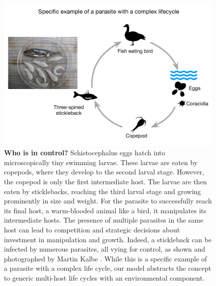 \documentclass[a4paper]{scrartcl}
\begin{document}
\begin{figure}[ht!]
\captionsetup{format=plain}
\centering
\includegraphics[width=0.8\columnwidth]{cartoon2.pdf}
\caption{\textbf{Who is in control?}
Schistocephalus eggs hatch into microscopically tiny swimming larvae. 
These larvae are eaten by copepods, where they develop to the second larval stage. 
However, the copepod is only the first intermediate host. 
The larvae are then eaten by sticklebacks, reaching the third larval stage and growing prominently in size and weight. 
For the parasite to successfully reach its final host, a warm-blooded animal like a bird, it manipulates its intermediate hosts.
The presence of multiple parasites in the same host can lead to competition and strategic decisions about investment in manipulation and growth.
Indeed, a stickleback can be infected by numerous parasites, all vying for control, as shown and photographed by Martin Kalbe \citep{kalbe:JFB:2002}.
While this is a specific example of a parasite with a complex life cycle, our model abstracts the concept to generic multi-host life cycles with an environmental component.
}
\label{fig:empirical}
\end{figure}
\end{document}
